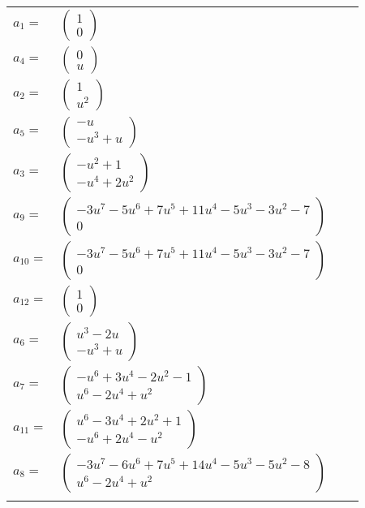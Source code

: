 \documentclass[1p]{elsarticle_modified}
\theoremstyle{definition}
\begin{document}
\begin{tabular}{m{7pt} m{180pt} m{7pt} m{180pt} }
\flushright $a_{1}=$&$\begin{pmatrix}1\\0\end{pmatrix}$ \\
\flushright $a_{4}=$&$\begin{pmatrix}0\\u\end{pmatrix}$ \\
\flushright $a_{2}=$&$\begin{pmatrix}1\\u^2\end{pmatrix}$ \\
\flushright $a_{5}=$&$\begin{pmatrix}- u\\- u^3+u\end{pmatrix}$ \\
\flushright $a_{3}=$&$\begin{pmatrix}- u^2+1\\- u^4+2 u^2\end{pmatrix}$ \\
\flushright $a_{9}=$&$\begin{pmatrix}-3 u^7-5 u^6+7 u^5+11 u^4-5 u^3-3 u^2-7\\0\end{pmatrix}$ \\
\flushright $a_{10}=$&$\begin{pmatrix}-3 u^7-5 u^6+7 u^5+11 u^4-5 u^3-3 u^2-7\\0\end{pmatrix}$ \\
\flushright $a_{12}=$&$\begin{pmatrix}1\\0\end{pmatrix}$ \\
\flushright $a_{6}=$&$\begin{pmatrix}u^3-2 u\\- u^3+u\end{pmatrix}$ \\
\flushright $a_{7}=$&$\begin{pmatrix}- u^6+3 u^4-2 u^2-1\\u^6-2 u^4+u^2\end{pmatrix}$ \\
\flushright $a_{11}=$&$\begin{pmatrix}u^6-3 u^4+2 u^2+1\\- u^6+2 u^4- u^2\end{pmatrix}$ \\
\flushright $a_{8}=$&$\begin{pmatrix}-3 u^7-6 u^6+7 u^5+14 u^4-5 u^3-5 u^2-8\\u^6-2 u^4+u^2\end{pmatrix}$\\&\end{tabular}
\end{document}
